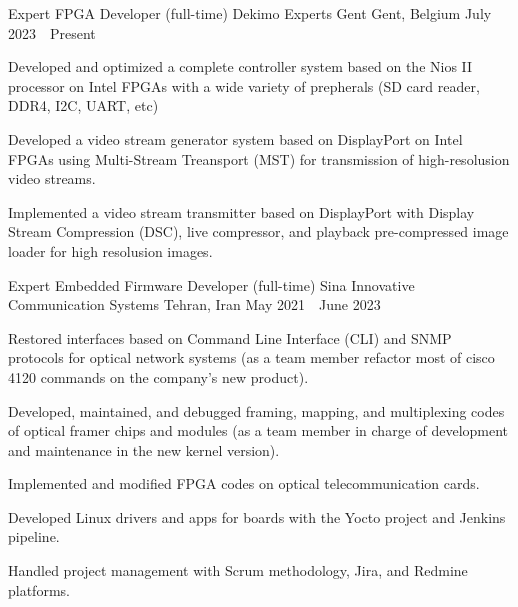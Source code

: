 


\begin{cventries}

  \cventry
  {Expert FPGA Developer (full-time)} %
  {Dekimo Experts Gent} %
  {Gent, Belgium} %
  {July 2023~\textendash~Present} %
  {
    \begin{cvitems} %
      \item {Developed and optimized a complete controller system based on the Nios II processor on Intel FPGAs with a wide variety of prepherals (SD card reader, DDR4, I2C, UART, etc)}
      \item {Developed a video stream generator system based on DisplayPort on Intel FPGAs using Multi-Stream Treansport (MST) for transmission of high-resolusion video streams.}
      \item {Implemented a video stream transmitter based on DisplayPort with Display Stream Compression (DSC), live compressor, and playback pre-compressed image loader for high resolusion images.}
    \end{cvitems}
  }

  \cventry
    {Expert Embedded Firmware Developer (full-time)} %
    {Sina Innovative Communication Systems} %
    {Tehran, Iran} %
    {May 2021~\textendash~June 2023} %
    {
      \begin{cvitems} %
        \item {Restored interfaces based on Command Line Interface (CLI) and SNMP protocols for optical network systems (as a team member refactor most of cisco 4120 commands on the company's new product).}
	      \item {Developed, maintained, and debugged framing, mapping, and multiplexing codes of optical framer chips and modules (as a team member in charge of development and maintenance in the new kernel version).}
        \item {Implemented and modified FPGA codes on optical telecommunication cards.}
	      \item {Developed Linux drivers and apps for boards with the Yocto project and Jenkins pipeline.}
	      \item {Handled project management with Scrum methodology, Jira, and Redmine platforms.}
      \end{cvitems}
    }


\end{cventries}
